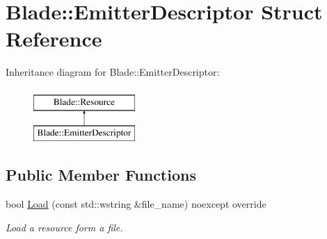 \hypertarget{struct_blade_1_1_emitter_descriptor}{}\section{Blade\+:\+:Emitter\+Descriptor Struct Reference}
\label{struct_blade_1_1_emitter_descriptor}
Inheritance diagram for Blade\+:\+:Emitter\+Descriptor\+:\begin{figure}[H]
\begin{center}
\leavevmode
\includegraphics[height=2.000000cm]{struct_blade_1_1_emitter_descriptor}
\end{center}
\end{figure}
\subsection*{Public Member Functions}
\begin{DoxyCompactItemize}
\item 
bool \hyperlink{struct_blade_1_1_emitter_descriptor_ac3bf4ccedee573630235f498a0c47822}{Load} (const std\+::wstring \&file\+\_\+name) noexcept override
\begin{DoxyCompactList}\small\item\em Load a resource form a file. \end{DoxyCompactList}\end{DoxyCompactItemize}
